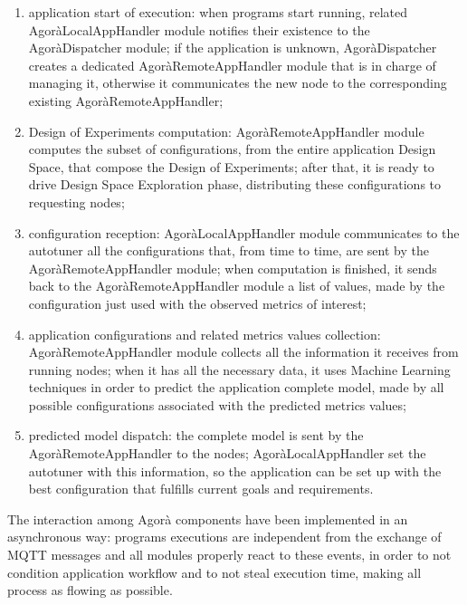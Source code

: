 \begin{enumerate}

    \item application start of execution: when programs start running, related AgoràLocalAppHandler module notifies their existence to the AgoràDispatcher module; if the application is unknown, AgoràDispatcher creates a dedicated AgoràRemoteAppHandler module that is in charge of managing it, otherwise it communicates the new node to the corresponding existing AgoràRemoteAppHandler;
    
    \item Design of Experiments computation: AgoràRemoteAppHandler module computes the subset of configurations, from the entire application Design Space, that compose the Design of Experiments; after that, it is ready to drive Design Space Exploration phase, distributing these configurations to requesting nodes;
    
    \item configuration reception: AgoràLocalAppHandler module communicates to the autotuner all the configurations that, from time to time, are sent by the AgoràRemoteAppHandler module; when computation is finished, it sends back to the AgoràRemoteAppHandler module a list of values, made by the configuration just used with the observed metrics of interest;
    
    \item application configurations and related metrics values collection: AgoràRemoteAppHandler module collects all the information it receives from running nodes; when it has all the necessary data, it uses Machine Learning techniques in order to predict the application complete model, made by all possible configurations associated with the predicted metrics values;
    
    \item predicted model dispatch: the complete model is sent by the AgoràRemoteAppHandler to the nodes; AgoràLocalAppHandler set the autotuner with this information, so the application can be set up with the best configuration that fulfills current goals and requirements.

\end{enumerate}

The interaction among Agorà components have been implemented in an asynchronous way: programs executions are independent from the exchange of MQTT messages and all modules properly react to these events, in order to not condition application workflow and to not steal execution time, making all process as flowing as possible.

